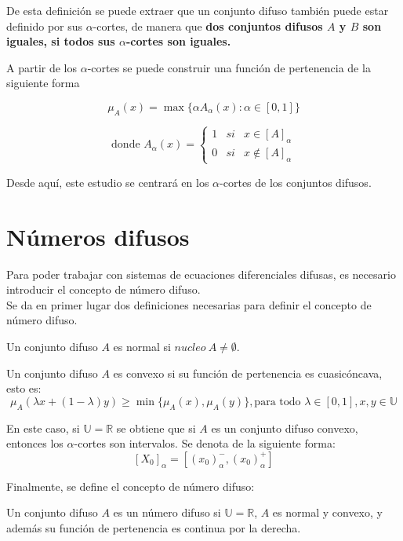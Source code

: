 De esta definición se puede extraer que un conjunto difuso también puede estar definido por sus $\alpha$-cortes, de manera que \textbf{dos conjuntos difusos $A$ y $B$ son iguales, si todos sus $\alpha$-cortes son iguales.} 

A partir de los $\alpha$-cortes se puede construir una función de pertenencia de la siguiente forma \cite{apuntesfuzzy}

\[
\mu_A(x) = \max{\{\alpha A_\alpha(x) : \alpha \in [0, 1]}\}
\]

\[
\text{donde }A_\alpha(x) = \left\{
\begin{array}{ccc}
  1 & si & x \in [A]_\alpha \\
  0 & si & x \notin [A]_\alpha
\end{array}
\right.
\]

Desde aquí, este estudio se centrará en los $\alpha$-cortes de los conjuntos difusos.

\section{Números difusos}
Para poder trabajar con sistemas de ecuaciones diferenciales difusas, es necesario introducir el concepto de número difuso. \\
Se da en primer lugar dos definiciones necesarias para definir el concepto de número difuso.

\begin{definicion}
  \label{def:difuso_normal}
  Un conjunto difuso $A$ es normal si $nucleo ~ A \neq \emptyset$.
\end{definicion}

\begin{definicion}
  \label{def:difuso_convexo}
  Un conjunto difuso $A$ es convexo si su función de pertenencia es cuasicóncava, esto es:
  \[
  \mu_A(\lambda x + (1-\lambda)y) \geq \min{\{\mu_A(x), \mu_A(y)\}}, \text{para todo } \lambda \in [0, 1], x, y \in \mathbb{U}
  \]
\end{definicion}

En este caso, si $\mathbb{U}=\mathbb{R}$ se obtiene que si $A$ es un conjunto difuso convexo, entonces los $\alpha$-cortes son intervalos. Se denota de la siguiente forma:
\[
  [X_0]_\alpha = [(x_0)_\alpha^- , (x_0)_\alpha^+]
  \]

  Finalmente, se define el concepto de número difuso:

  \begin{definicion}
    \label{def:numero_difuso}
    Un conjunto difuso $A$ es un número difuso si $\mathbb{U}=\mathbb{R}$, $A$ es normal y convexo, y además su función de pertenencia es continua por la derecha.
  \end{definicion}


